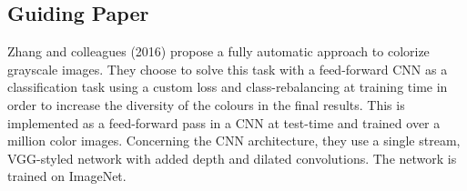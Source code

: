 \documentclass[12pt,letterpaper]{article}
\begin{document}
\subsection{Guiding Paper} 
Zhang and colleagues (2016) propose a fully automatic approach to colorize grayscale images. They choose to solve this task with a feed-forward CNN as a classification task using a custom loss and class-rebalancing at training time in order to increase the diversity of the colours in the final results. This is implemented as a feed-forward pass in a CNN at test-time and trained over a million color images. Concerning the CNN architecture, they use a single stream, VGG-styled network with added depth and dilated convolutions. The network is trained on ImageNet.\\
\end{document}
